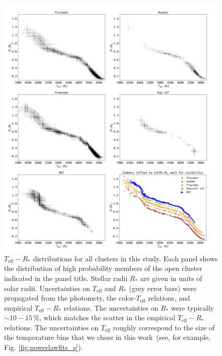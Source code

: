 \documentclass{aa}
\begin{document}
   \begin{figure}
		\centering
           \includegraphics[width=1.015\hsize]{pics/clusters/teff_R.png}

      \caption{$T_\mathrm{eff}-R_*$ distributions for all clusters in this study. Each panel shows the distribution of high probability members of the open cluster indicated in the panel title. Stellar radii $R_*$ are given in units of solar radii. Uncertainties on $T_\mathrm{eff}$ and $R_*$ (grey error bars) were propagated from the photomety, the color-$T_\mathrm{eff}$ relations, and empirical $T_\mathrm{eff}-R_*$ relations. The uncertainties on $R_*$ were typically $\sim10-15$\,\%, which matches the scatter in the empirical $T_\mathrm{eff}-R_*$ relations. The uncertainties on $T_\mathrm{eff}$ roughly correspond to the size of the temperature bins that we chose in this work~(see, for example, Fig. \ref{fig:powerlawfits_s}).}
         \label{fig:teff_radius}
         
   \end{figure}

   
\end{document}
